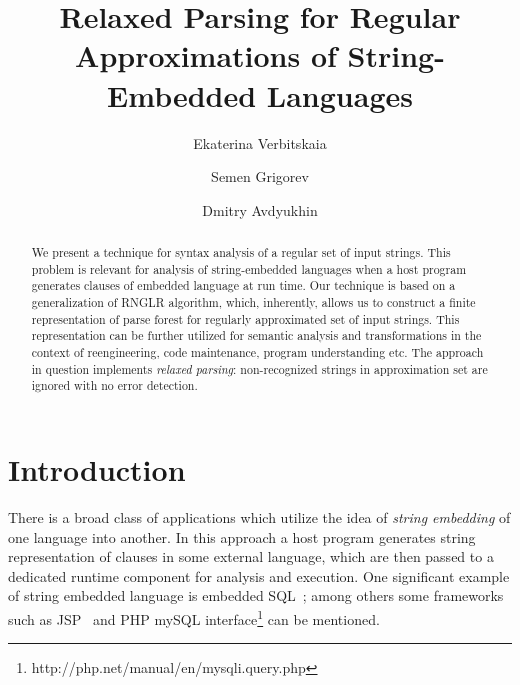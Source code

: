 \documentclass{llncs}
\begin{document}
\frontmatter          %

\pagestyle{headings}  %

\title{Relaxed Parsing for Regular Approximations of String-Embedded Languages}


\author{Ekaterina Verbitskaia \and Semen Grigorev
\and Dmitry Avdyukhin}
%
%


\maketitle              %

\begin{abstract}
We present a technique for syntax analysis of a regular set of input strings. 
This problem is relevant for analysis of string-embedded languages when a host 
program generates clauses of embedded language at run time. Our technique 
is based on a generalization of RNGLR algorithm, which, inherently, allows 
us to construct a finite representation of parse forest for regularly 
approximated set of input strings. This representation can be further 
utilized for semantic analysis and transformations in the context of 
reengineering, code maintenance, program understanding etc. The approach 
in question implements \emph{relaxed parsing}: non-recognized strings 
in approximation set are ignored with no error detection. 
\end{abstract}

\section*{Introduction}
There is a broad class of applications which utilize the idea of \emph{string embedding} of one 
language into another. In this approach a host program generates string representation of 
clauses in some external language, which are then passed to a dedicated runtime 
component for analysis and execution. One significant example of string embedded 
language is embedded SQL~\cite{DSQLISO}; among others some frameworks 
such as JSP~\cite{JSP} and PHP mySQL interface\footnote{http://php.net/manual/en/mysqli.query.php} 
can be mentioned.
\end{document}
